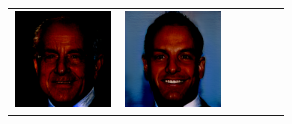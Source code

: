 \documentclass{article}
\newcommand{\pganw}{1.0in}
\begin{document}
\begin{table}[htbp]
\begin{center}
\begin{tabular}{cc|cc|cc}
\includegraphics[width=\pganw]{figures/pgan/14_base_iso_MH.png} &
\includegraphics[width=\pganw]{figures/pgan/15_base_iso_MH.png}
\end{tabular}
\end{center}
\end{table}

\FloatBarrier


\end{document}
